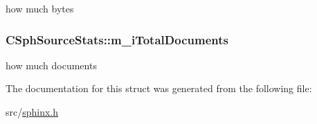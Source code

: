 how much bytes 

\hypertarget{structCSphSourceStats_ac75bd0c5deccaa20785431e1deb783db}{
\subsubsection[{m\-\_\-i\-Total\-Documents}]{ C\-Sph\-Source\-Stats\-::m\-\_\-i\-Total\-Documents}}\label{structCSphSourceStats_ac75bd0c5deccaa20785431e1deb783db}


how much documents 



The documentation for this struct was generated from the following file\-:\begin{DoxyCompactItemize}
\item 
src/\hyperlink{sphinx_8h}{sphinx.\-h}\end{DoxyCompactItemize}
